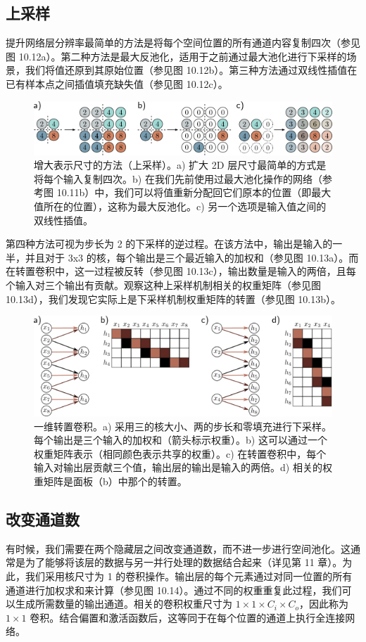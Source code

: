 \subsection{上采样}
提升网络层分辨率最简单的方法是将每个空间位置的所有通道内容复制四次（参见图 10.12a）。第二种方法是最大反池化，适用于之前通过最大池化进行下采样的场景，我们将值还原到其原始位置（参见图 10.12b）。第三种方法通过双线性插值在已有样本点之间插值填充缺失值（参见图 10.12c）。


\begin{figure}[ht!]
	\centering
	\includegraphics[width=0.7\linewidth]{png/chapter10/ConvUp.png}
	\caption{增大表示尺寸的方法（上采样）。a) 扩大 2D 层尺寸最简单的方式是将每个输入复制四次。b) 在我们先前使用过最大池化操作的网络（参考图 10.11b）中，我们可以将值重新分配回它们原本的位置（即最大值所在的位置），这称为最大反池化。c) 另一个选项是输入值之间的双线性插值。}
\end{figure}


第四种方法可视为步长为 2 的下采样的逆过程。在该方法中，输出是输入的一半，并且对于 3x3 的核，每个输出是三个最近输入的加权和（参见图 10.13a）。而在转置卷积中，这一过程被反转（参见图 10.13c），输出数量是输入的两倍，且每个输入对三个输出有贡献。观察这种上采样机制相关的权重矩阵（参见图 10.13d），我们发现它实际上是下采样机制权重矩阵的转置（参见图 10.13b）。


\begin{figure}[ht!]
	\centering
	\includegraphics[width=0.7\linewidth]{png/chapter10/ConvTranspose.png}
	\caption{一维转置卷积。a) 采用三的核大小、两的步长和零填充进行下采样。每个输出是三个输入的加权和（箭头标示权重）。b) 这可以通过一个权重矩阵表示（相同颜色表示共享的权重）。c) 在转置卷积中，每个输入对输出层贡献三个值，输出层的输出是输入的两倍。d) 相关的权重矩阵是面板（b）中那个的转置。}
\end{figure}


\subsection{改变通道数}
有时候，我们需要在两个隐藏层之间改变通道数，而不进一步进行空间池化。这通常是为了能够将该层的数据与另一并行处理的数据结合起来（详见第 11 章）。为此，我们采用核尺寸为 1 的卷积操作。输出层的每个元素通过对同一位置的所有通道进行加权求和来计算（参见图 10.14）。通过不同的权重重复此过程，我们可以生成所需数量的输出通道。相关的卷积权重尺寸为 \(1 \times 1 \times C_i \times C_o\)，因此称为 \(1 \times 1\) 卷积。结合偏置和激活函数后，这等同于在每个位置的通道上执行全连接网络。


